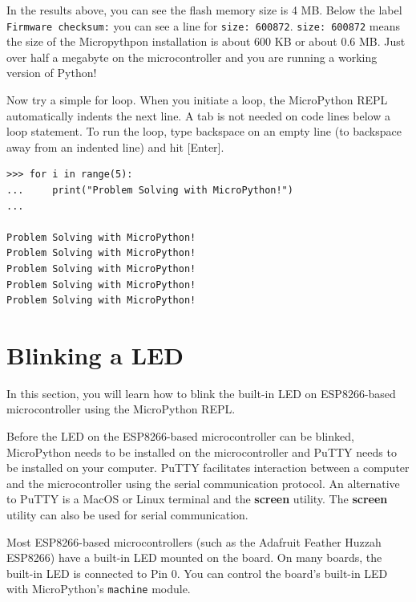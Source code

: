 \documentclass{book}
\begin{document}
In the results above, you can see the flash memory size is 4 MB. Below
the label \lstinline!Firmware checksum:! you can see a line for
\lstinline!size: 600872!. \lstinline!size: 600872! means the size of the
Micropythpon installation is about 600 KB or about 0.6 MB. Just over
half a megabyte on the microcontroller and you are running a working
version of Python!

Now try a simple for loop. When you initiate a loop, the MicroPython
REPL automatically indents the next line. A tab is not needed on code
lines below a loop statement. To run the loop, type backspace on an
empty line (to backspace away from an indented line) and hit
{[}Enter{]}.

\begin{lstlisting}
>>> for i in range(5):
...     print("Problem Solving with MicroPython!")
...

Problem Solving with MicroPython!
Problem Solving with MicroPython!
Problem Solving with MicroPython!
Problem Solving with MicroPython!
Problem Solving with MicroPython!
\end{lstlisting}
    




    
        \section{Blinking a LED}\label{blinking-a-led}
    




    
        In this section, you will learn how to blink the built-in LED on
ESP8266-based microcontroller using the MicroPython REPL.

Before the LED on the ESP8266-based microcontroller can be blinked,
MicroPython needs to be installed on the microcontroller and PuTTY needs
to be installed on your computer. PuTTY facilitates interaction between
a computer and the microcontroller using the serial communication
protocol. An alternative to PuTTY is a MacOS or Linux terminal and the
\textbf{screen} utility. The \textbf{screen} utility can also be used
for serial communication.
    




    
        Most ESP8266-based microcontrollers (such as the Adafruit Feather Huzzah
ESP8266) have a built-in LED mounted on the board. On many boards, the
built-in LED is connected to Pin 0. You can control the board's built-in
LED with MicroPython's \lstinline!machine! module.
    
\end{document}
